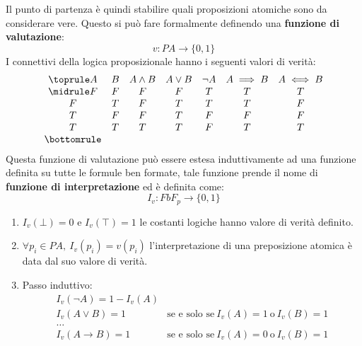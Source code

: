 Il punto di partenza è quindi stabilire quali proposizioni atomiche sono da
considerare vere. Questo si può fare formalmente definendo una \textbf{funzione
    di valutazione}:
\begin{equation}
    v: PA \to \{0, 1\}
\end{equation}
I connettivi della logica proposizionale hanno i seguenti valori di verità:
\begin{equation}
    \begin{array}{ccccccc}
        \toprule
        A & B & A \land B & A \lor B & \lnot A & A \implies B & A \iff B \\
        \midrule
        F & F & F         & F        & T       & T            & T        \\
        F & T & F         & T        & T       & T            & F        \\
        T & F & F         & T        & F       & F            & F        \\
        T & T & T         & T        & F       & T            & T        \\
        \bottomrule
    \end{array}
\end{equation}
Questa funzione di valutazione può essere estesa induttivamente ad una funzione
definita su tutte le formule ben formate, tale funzione prende il nome di
\textbf{funzione di interpretazione} ed è definita come:
\begin{equation}
    I_v: FbF_p \to \{0, 1\}
\end{equation}
\begin{enumerate}
    \item $I_v (\bot) = 0$ e $I_v (\top) = 1$ le costanti logiche hanno valore
          di verità definito.
    \item $\forall p_i \in PA, \ I_v(p_i) = v(p_i)$ l'interpretazione di una
          preposizione atomica è data dal suo valore di verità.
    \item Passo induttivo:
          \begin{equation}
              \begin{array}{cc}
                  I_v(\lnot A) = 1 - I_v(A) &                                  \\
                  I_v(A \lor B) = 1         & \text{se e solo se} \ I_v(A) = 1
                  \ \text{o} \ I_v(B) = 1                                      \\
                  \dots                     &                                  \\
                  I_v(A \to B) = 1          & \text{se e solo se} \ I_v(A) = 0
                  \ \text{o} \ I_v(B) = 1
              \end{array}
          \end{equation}
\end{enumerate}
